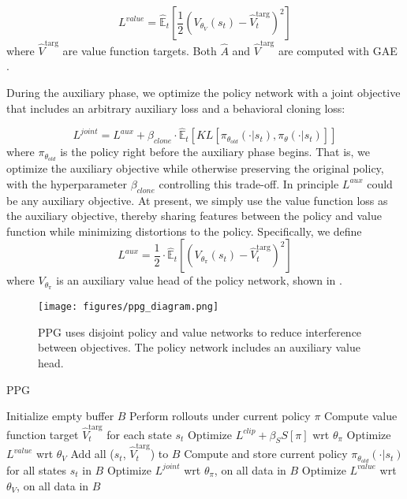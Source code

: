 \documentclass{article}
\begin{document}
$$L^{value} = \mathbb{\hat{E}}_t\left[\frac{1}{2}(V_{\theta_V}(s_t) -  \hat{V}^{\text{targ}}_{t})^2\right]$$
where $\hat{V}^{\text{targ}}$ are value function targets. Both $\hat{A}$ and $\hat{V}^{\text{targ}}$ are computed with GAE \citep{gae}.

During the auxiliary phase, we optimize the policy network with a joint objective that includes an arbitrary auxiliary loss and a behavioral cloning loss:

$$L^{joint} = L^{aux} + \beta_{clone} \cdot \mathbb{\hat{E}}_t\left[KL[\pi_{\theta_{old}}(\cdot|s_t),\pi_{\theta}(\cdot|s_t)]\right]$$
where $\pi_{\theta_{old}}$ is the policy right before the auxiliary phase begins. That is, we optimize the auxiliary objective while otherwise preserving the original policy, with the hyperparameter $\beta_{clone}$ controlling this trade-off. In principle $L^{aux}$ could be any auxiliary objective. At present, we simply use the value function loss as the auxiliary objective, thereby sharing features between the policy and value function while minimizing distortions to the policy. Specifically, we define $$L^{aux} = \frac{1}{2} \cdot \mathbb{\hat{E}}_t\left[(V_{\theta_{\pi}}(s_t) -  \hat{V}^{\text{targ}}_{t})^2\right]$$ where $V_{\theta_{\pi}}$ is an auxiliary value head of the policy network, shown in .

\begin{figure*}
\centering
\texttt{[image: figures/ppg\_diagram.png]}
\caption{PPG uses disjoint policy and value networks to reduce interference between objectives. The policy network includes an auxiliary value head.}
\label{fig:ppg_arch}
\end{figure*}

\begin{algorithm}
\caption{PPG}
\begin{algorithmic}
  \State Initialize empty buffer $B$
    \State Perform rollouts under current policy $\pi$
    \State Compute value function target $\hat{V}^{\text{targ}}_{t}$ for each state $s_t$
        \State Optimize $L^{clip} + \beta_SS[\pi]$ wrt $\theta_\pi$
    \EndFor
        \State Optimize $L^{value}$ wrt $\theta_V$
    \EndFor
    \State Add all ($s_t$, $\hat{V}^{\text{targ}}_{t}$) to $B$
  \EndFor
  \State Compute and store current policy $\pi_{\theta_{old}}(\cdot|s_t)$ for all states $s_t$ in $B$
    \State Optimize $L^{joint}$ wrt $\theta_\pi$, on all data in $B$
    \State Optimize $L^{value}$ wrt $\theta_V$, on all data in $B$
  \EndFor
\EndFor
\end{algorithmic}
\end{algorithm}
\end{document}
